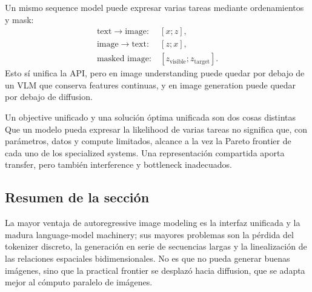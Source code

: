 Un mismo sequence model puede expresar varias tareas mediante ordenamientos y mask:
\[
\begin{aligned}
\text{text}\rightarrow\text{image}:&\ [x;z],\\
\text{image}\rightarrow\text{text}:&\ [z;x],\\
\text{masked image}:&\ [z_{\text{visible}};z_{\text{target}}].
\end{aligned}
\]
Esto sí unifica la API, pero en image understanding puede quedar por debajo de un VLM que conserva features continuas, y en image generation puede quedar por debajo de diffusion.


\begin{warningbox}{Un objective unificado y una solución óptima unificada son dos cosas distintas}
Que un modelo pueda expresar la likelihood de varias tareas no significa que, con parámetros, datos y compute limitados, alcance a la vez la Pareto frontier de cada uno de los specialized systems. Una representación compartida aporta transfer, pero también interference y bottleneck inadecuados.
\end{warningbox}


\subsection{Resumen de la sección}

La mayor ventaja de autoregressive image modeling es la interfaz unificada y la madura language-model machinery; sus mayores problemas son la pérdida del tokenizer discreto, la generación en serie de secuencias largas y la linealización de las relaciones espaciales bidimensionales. No es que no pueda generar buenas imágenes, sino que la practical frontier se desplazó hacia diffusion, que se adapta mejor al cómputo paralelo de imágenes.
